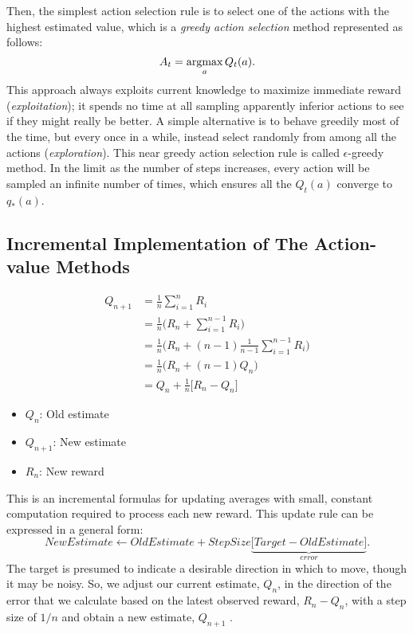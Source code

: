 Then, the simplest action selection rule is to select one of the actions with the highest estimated value, which is a \textit{greedy action selection} method represented as follows:
$$A_t=\operatorname*{\operatorname{argmax}}_{a}Q_t(a).$$
This approach always exploits current knowledge to maximize immediate reward (\ie \textit{exploitation}); it spends no time at all sampling apparently inferior actions to see if they might really be better. A simple alternative is to behave greedily most of the time, but every once in a while, instead select randomly from among all the actions (\ie \textit{exploration}). This near greedy action selection rule is called $\epsilon$-greedy method. In the limit as the number of steps increases, every action will be sampled an infinite number of times, which ensures all the $Q_t(a)$ converge to $q_*(a)$.

\subsection{Incremental Implementation of The Action-value Methods}
\begin{align*}
	Q_{n+1} &= \frac{1}{n}\sum_{i=1}^{n}R_i\\
	&= \frac{1}{n} \Bigg(R_n + \sum_{i=1}^{n-1}R_i \Bigg)\\
	&= \frac{1}{n} \Bigg(R_n + (n-1)\frac{1}{n-1} \sum_{i=1}^{n-1}R_i \Bigg)\\
	&= \frac{1}{n} \Bigg(R_n + (n-1)Q_n \Bigg)\\
	&=  Q_n + \frac{1}{n} \Big[R_n - Q_n \Big]
\end{align*}
\begin{itemize}
	\item $Q_n$: Old estimate
	\item $Q_{n+1}$: New estimate
	\item $R_{n}$: New reward
\end{itemize}

This is an incremental formulas for updating averages with small, constant computation required to process each new reward. This update rule can be expressed in a general form:
$$NewEstimate \leftarrow OldEstimate + StepSize \underbrace{\Big[Target - OldEstimate \Big]}_{error}.$$
The target is presumed to indicate a desirable direction in which to move, though it may be noisy. So, we adjust our current estimate, $Q_n$, in the direction of the error that we calculate based on the latest observed reward, $R_n-Q_n$, with a step size of $1/n$   and obtain  a new estimate, $Q_{n+1}$ . 









